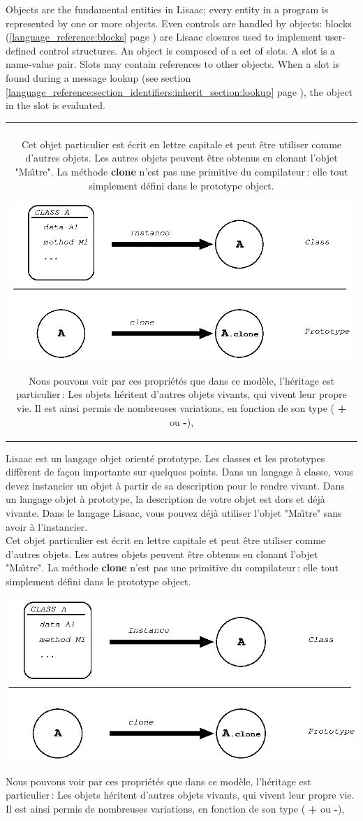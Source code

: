 \documentclass[11pt]{mybook}
\newcommand{\fr}[1]{
  \if \frenchversion 1
    \if \englishversion 1    
    \vspace{2mm}
    \noindent\begin{tabular}{|c}
      {
        \begin{minipage}{15.5cm}
          \textit{#1}
        \end{minipage}
      }
    \end{tabular}
    \else
    #1
    \fi
  \fi
}
\begin{document}
{\begin{center}
\end{center}
Objects are the fundamental entities in Lisaac; every entity 
in a program is represented by one or more objects. 
Even controls are handled by objects: blocks (\ref{language_reference:blocks} page \pageref{language_reference:blocks}) are 
Lisaac closures used to implement user-defined control structures. 
An object is composed of a set of slots. 
A slot is a name-value pair.
Slots may contain references to other objects. 
When a slot is found during a message lookup (see section \ref{language_reference:section_identifiers:inherit_section:lookup} 
page \pageref{language_reference:section_identifiers:inherit_section:lookup}), the object in the slot is
evaluated.
}

\fr{
Lisaac est un langage objet orient\'e prototype.
Les classes et les prototypes diff\`erent de fa\c con importante sur quelques points.  \index{Class} \index{Prototype}
Dans un langage \`a classe, vous devez instancier un objet \`a partir de sa description pour le rendre vivant.
Dans un langage objet \`a prototype, la description de votre objet est dors et d\'ej\`a vivante.
Dans le langage Lisaac, vous pouvez d\'ej\`a utiliser l'objet "Ma\^\i tre" sans avoir \`a l'instancier. \index{Object}\\
Cet objet particulier est \'ecrit en lettre capitale et peut \^etre utiliser comme d'autres objets.
Les autres objets peuvent \^etre obtenus en clonant l'objet "Ma\^\i tre". 
La m\'ethode {\bf{}clone} n'est pas une primitive du compilateur\,: elle tout simplement d\'efini dans le prototype {\sc{}object}.
		\begin{center}
		\includegraphics[scale=0.9]{figures/class_vs_prototype1} 
		\end{center}
Nous pouvons voir par ces propri\'et\'es que dans ce mod\`ele, l'h\'eritage est particulier\,: 
 Les objets h\'eritent d'autres objets vivants, qui vivent leur propre vie.
Il est ainsi permis de nombreuses variations, en fonction de son type  ({\bf{} +} ou {\bf{} -}), 
}
\end{document}
